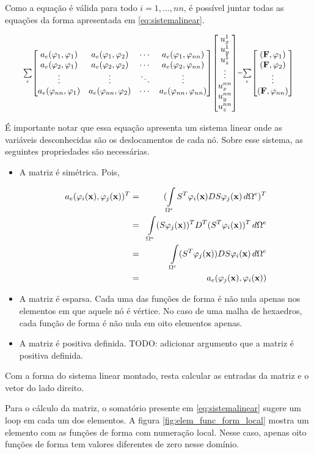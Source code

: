 Como a equação é válida para todo $i=1,...,nn$, é possível juntar todas as equações da forma apresentada em \ref{eq:sistemalinear}.

\begin{equation}\scriptstyle
\sum\limits_e\aemat\libvetor = \sum\limits_e \begin{bmatrix}
\ldint[1] \\
\ldint[2] \\
\vdots    \\
\ldint[nn]
\end{bmatrix}
\label{eq:sistemalinear}
\end{equation}

É importante notar que essa equação apresenta um sistema linear onde as variáveis desconhecidas são os deslocamentos de cada nó. Sobre esse sistema, as seguintes propriedades são necessárias.

\begin{itemize}
    \item A matriz é simétrica. Pois,

    \begin{eqnarray}
    a_e(\varphi_i(\mathbf{x}),\varphi_j(\mathbf{x}))^T & = & (\int\limits_{\Omega^e} S^T\varphi_i(\mathbf{x}) D S\varphi_j(\mathbf{x}) \, d\Omega^e)^T \\
                         & = & \int\limits_{\Omega^e} (S\varphi_j(\mathbf{x}))^T D^T (S^T\varphi_i(\mathbf{x}))^T \, d\Omega^e \\
                         & = & \int\limits_{\Omega^e} (S^T\varphi_j(\mathbf{x})) D S \varphi_i(\mathbf{x}) \, d\Omega^e \\
                         & = & a_e(\varphi_j(\mathbf{x}),\varphi_i(\mathbf{x}))
    \end{eqnarray}

    \item A matriz é esparsa. Cada uma das funções de forma é não nula apenas nos elementos em que aquele nó é vértice. No caso de uma malha de hexaedros, cada função de forma é não nula em oito elementos apenas.

    \item A matriz é positiva definida. {\color{red}TODO: adicionar argumento que a matriz é positiva definida.}
\end{itemize}

Com a forma do sistema linear montado, resta calcular as entradas da matriz e o vetor do lado direito.

Para o cálculo da matriz, o somatório presente em \ref{eq:sistemalinear} sugere um loop em cada um dos elementos. A figura \ref{fig:elem_func_form_local} mostra um elemento com as funções de forma com numeração local. Nesse caso, apenas oito funções de forma tem valores diferentes de zero nesse domínio.

